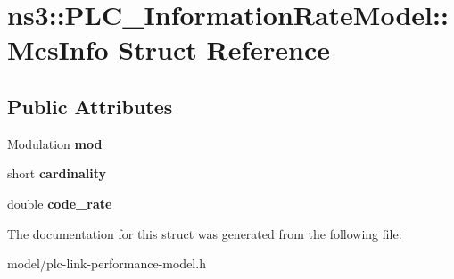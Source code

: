 \hypertarget{structns3_1_1PLC__InformationRateModel_1_1McsInfo}{\section{ns3\-:\-:\-P\-L\-C\-\_\-\-Information\-Rate\-Model\-:\-:\-Mcs\-Info \-Struct \-Reference}
\label{structns3_1_1PLC__InformationRateModel_1_1McsInfo}
}
\subsection*{\-Public \-Attributes}
\begin{DoxyCompactItemize}
\item 
\hypertarget{structns3_1_1PLC__InformationRateModel_1_1McsInfo_a2fdac4660b70edc484fa1bae5ed8bc46}{\-Modulation {\bfseries mod}}\label{structns3_1_1PLC__InformationRateModel_1_1McsInfo_a2fdac4660b70edc484fa1bae5ed8bc46}

\item 
\hypertarget{structns3_1_1PLC__InformationRateModel_1_1McsInfo_a698c5da7aad3597c92d37aa543f4836a}{short {\bfseries cardinality}}\label{structns3_1_1PLC__InformationRateModel_1_1McsInfo_a698c5da7aad3597c92d37aa543f4836a}

\item 
\hypertarget{structns3_1_1PLC__InformationRateModel_1_1McsInfo_a30886bd72659c48e26a5811ec05fc1a2}{double {\bfseries code\-\_\-rate}}\label{structns3_1_1PLC__InformationRateModel_1_1McsInfo_a30886bd72659c48e26a5811ec05fc1a2}

\end{DoxyCompactItemize}


\-The documentation for this struct was generated from the following file\-:\begin{DoxyCompactItemize}
\item 
model/plc-\/link-\/performance-\/model.\-h\end{DoxyCompactItemize}

